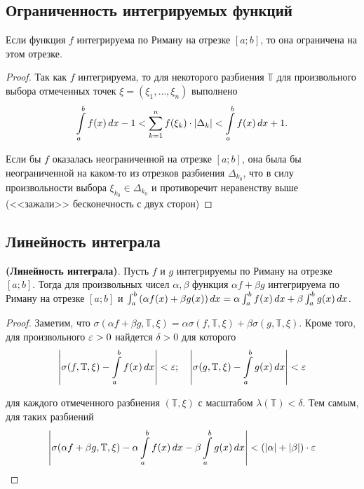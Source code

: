\documentclass[a4paper]{article}
\theoremstyle{named}
\newcommand{\T}{\mathbb{T}}
\renewcommand{\int}{\intop}
\begin{document}
        \subsection{Ограниченность интегрируемых функций}

        \begin{proposal*}
            Если функция $f$ интегрируема по Риману на отрезке $[a; b]$, то она ограничена на этом отрезке.
        \end{proposal*}

        \begin{proof}
            Так как $f$ интегрируема, то для некоторого разбиения $\T$ для произвольного выбора отмеченных точек $\xi = (\xi_1, \dots, \xi_n)$ выполнено
            \begin{equation*}
                \int_a^b f(x) \dd x - 1 < \sum_{k = 1}^n f(\xi_k) \cdot |\Delta_k| < \int_a^b f(x) \dd x + 1.
            \end{equation*}

            Если бы $f$ оказалась неограниченной на отрезке $[a; b]$, она была бы неограниченной на каком-то из отрезков разбиения $\Delta_{k_0}$, что в силу произвольности выбора $\xi_{k_0} \in \Delta_{k_0}$ и противоречит неравенству выше (<<зажали>> бесконечность с двух сторон)
        \end{proof}

        \subsection{Линейность интеграла}

        \begin{proposal*}
            \textbf{(Линейность интеграла)}. Пусть $f$ и $g$ интегрируемы по Риману на отрезке $[a; b]$. Тогда для произвольных чисел $\alpha, \beta$ функция $\alpha f + \beta g$ интегрируема по Риману на отрезке $[a; b]$ и $\int_a^b \left(\alpha f(x) + \beta g(x)\right) \dd x = \alpha \int_a^b f(x) \dd x + \beta \int_a^b g(x) \dd x$.
        \end{proposal*}

        \begin{proof}
            Заметим, что $\sigma(\alpha f + \beta g, \T, \xi) = \alpha \sigma(f, \T, \xi) + \beta \sigma(g, \T, \xi)$. Кроме того, для произвольного $\varepsilon > 0$ найдется $\delta > 0$ для которого
            \begin{equation*}
                \left|\sigma(f, \T, \xi) - \int_a^b f(x) \dd x\right| < \eps; \quad
                \left|\sigma(g, \T, \xi) - \int_a^b g(x) \dd x\right| < \eps
            \end{equation*}

            для каждого отмеченного разбиения $(\T, \xi)$ с масштабом $\lambda(\T) < \delta$. Тем самым, для таких разбиений
            \begin{equation*}
                \left|\sigma(\alpha f + \beta g, \T, \xi) - \alpha \int_a^b f(x) \dd x - \beta \int_a^b g(x) \dd x\right| < (|\alpha| + |\beta|) \cdot \eps
            \end{equation*}
        \end{proof}
\end{document}
